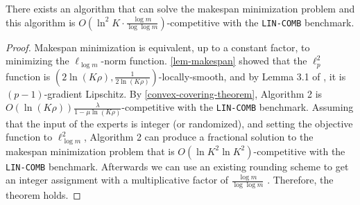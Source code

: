 \begin{theorem}
There exists an algorithm that can solve the makespan minimization problem and this algorithm is \break $O(\ln^2 K \cdot \frac{\log m}{ \log \log m})$-competitive with the \texttt{LIN-COMB} benchmark.
\end{theorem}
%
\begin{proof}
    Makespan minimization is equivalent, up to a constant factor, to minimizing the $\ell_{\log m}$-norm function. \cref{lem-makespan} showed that the $\ell_{p}^{2}$ function is $(2\ln(K\rho),\frac{1}{2\ln(K\rho)})$-locally-smooth, and by Lemma 3.1 of \cite{CombettesPokutta21:RevisitingTheApproximateCaratheodoryProblem}, it is $(p-1)$-gradient Lipschitz.
    By \cref{convex-covering-theorem}, Algorithm 2 is $O(\ln(K \rho)) \frac{\lambda}{1 - \mu \ln (K\rho)}$-competitive with the \texttt{LIN-COMB} benchmark. Assuming that the input of the experts is integer (or randomized), and setting the objective function to $\ell_{\log m}^{2}$, Algorithm 2 can produce a fractional solution to the makespan minimization problem that is $O(\ln K^2 \ln K^2)$-competitive with the \texttt{LIN-COMB} benchmark.
    Afterwards we can use an existing rounding scheme to get an integer assignment with a multiplicative factor of $\frac{\log m}{ \log \log m}$ \cite{ShiJiayi21:OnlineUnrelatedMachineLoadBalancing}. Therefore, the theorem holds.
\end{proof}
